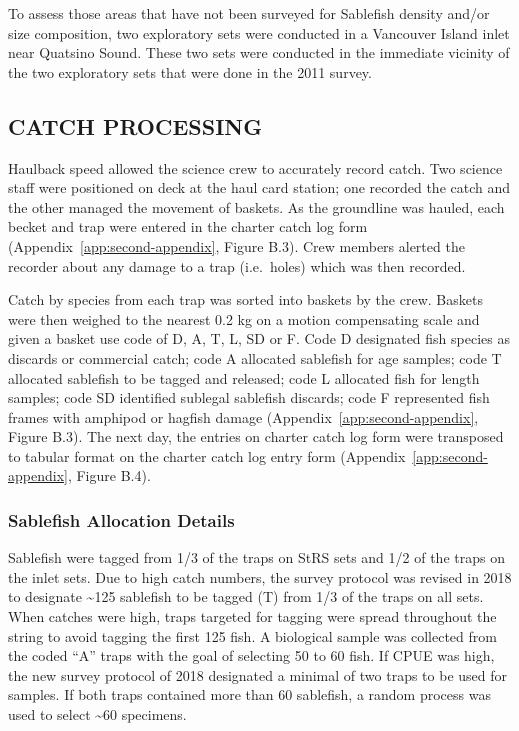 \documentclass[12pt]{article}\usepackage[]{graphicx}\usepackage[]{color}
\begin{document}
To assess those areas that have not been surveyed for Sablefish density and/or size composition, two exploratory sets were conducted in a Vancouver Island inlet near Quatsino Sound. These two sets were conducted in the immediate vicinity of the two exploratory sets that were done in the 2011 survey.

\hypertarget{catch-processing}{%
\subsection{CATCH PROCESSING}\label{catch-processing}}

Haulback speed allowed the science crew to accurately record catch. Two science staff were positioned on deck at the haul card station; one recorded the catch and the other managed the movement of baskets. As the groundline was hauled, each becket and trap were entered in the charter catch log form (Appendix~\ref{app:second-appendix}, Figure B.3). Crew members alerted the recorder about any damage to a trap (i.e.~holes) which was then recorded.

Catch by species from each trap was sorted into baskets by the crew. Baskets were then weighed to the nearest 0.2 kg on a motion compensating scale and given a basket use code of D, A, T, L, SD or F. Code D designated fish species as discards or commercial catch; code A allocated sablefish for age samples; code T allocated sablefish to be tagged and released; code L allocated fish for length samples; code SD identified sublegal sablefish discards; code F represented fish frames with amphipod or hagfish damage (Appendix~\ref{app:second-appendix}, Figure B.3). The next day, the entries on charter catch log form were transposed to tabular format on the charter catch log entry form (Appendix~\ref{app:second-appendix}, Figure B.4).

\hypertarget{sablefish-allocation-details}{%
\subsubsection{Sablefish Allocation Details}\label{sablefish-allocation-details}}

Sablefish were tagged from 1/3 of the traps on StRS sets and 1/2 of the traps on the inlet sets. Due to high catch numbers, the survey protocol was revised in 2018 to designate \textasciitilde125 sablefish to be tagged (T) from 1/3 of the traps on all sets. When catches were high, traps targeted for tagging were spread throughout the string to avoid tagging the first 125 fish. A biological sample was collected from the coded ``A'' traps with the goal of selecting 50 to 60 fish. If CPUE was high, the new survey protocol of 2018 designated a minimal of two traps to be used for samples. If both traps contained more than 60 sablefish, a random process was used to select \textasciitilde60 specimens.
\end{document}

